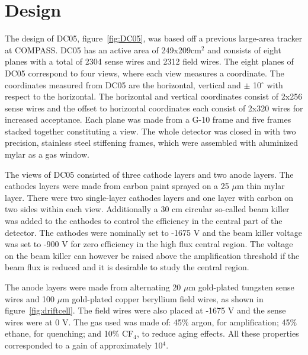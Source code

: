 \section{Design}


The design of DC05, figure~\ref{fig:DC05}, was based off a previous large-area
tracker at COMPASS.  DC05 has an active area of 249x209cm$^2$ and consists of
eight planes with a total of 2304 sense wires and 2312 field wires.  The eight
planes of DC05 correspond to four views, where each view measures a coordinate.
The coordinates measured from DC05 are the horizontal, vertical and $\pm$
10$^{\circ}$ with respect to the horizontal.  The horizontal and vertical
coordinates consist of 2x256 sense wires and the offset to horizontal
coordinates each consist of 2x320 wires for increased acceptance.  Each plane
was made from a G-10 frame and five frames stacked together constituting a view.
The whole detector was closed in with two precision, stainless steel stiffening
frames, which were assembled with aluminized mylar as a gas window. \par The
views of DC05 consisted of three cathode layers and two anode layers.  The
cathodes layers were made from carbon paint sprayed on a 25 $\mu$m thin mylar
layer.  There were two single-layer cathodes layers and one layer with carbon on
two sides within each view.  Additionally a 30 cm circular so-called beam killer
was added to the cathodes to control the efficiency in the central part of the
detector.  The cathodes were nominally set to -1675 V and the beam killer
voltage was set to -900 V for zero efficiency in the high flux central region.
The voltage on the beam killer can however be raised above the amplification
threshold if the beam flux is reduced and it is desirable to study the central
region.  \par The anode layers were made from alternating 20 $\mu$m gold-plated
tungsten sense wires and 100 $\mu$m gold-plated copper beryllium field wires, as
shown in figure~\ref{fig:driftcell}.  The field wires were also placed at -1675
V and the sense wires were at 0 V.  The gas used was made of: 45\% argon, for
amplification; 45\% ethane, for quenching; and 10\% CF$_4$, to reduce aging
effects.  All these properties corresponded to a gain of approximately 10$^4$.

